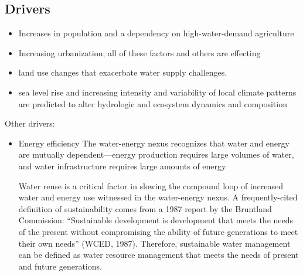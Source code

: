 \subsection{Drivers}
\begin{itemize}
\item Increases in population and a dependency on high-water-demand agriculture
\item Increasing urbanization; all of these factors and others are effecting 
\item land use changes that exacerbate water supply challenges. 
\item sea level rise and increasing intensity and variability of local climate patterns are predicted to alter hydrologic and ecosystem dynamics and composition
\end{itemize}
Other drivers:
\begin{itemize}
\item Energy efficiency
The water-energy nexus recognizes that water and energy are mutually dependent—energy production requires large volumes of water, and water infrastructure requires large amounts of energy

Water reuse is a critical factor in slowing the compound loop of increased water and energy use witnessed in the water-energy nexus. A frequently-cited definition of sustainability comes from a 1987 report by the Bruntland Commission: “Sustainable development is development that meets the needs of the present without compromising the ability of future generations to meet their own needs” (WCED, 1987). Therefore, sustainable water management can be defined as water resource management that meets the needs of present and future generations.

\end{itemize}

